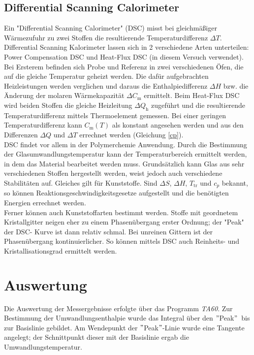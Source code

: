 \documentclass[12pt,a4paper,titlepage,headinclude,bibtotoc]{scrartcl}
\begin{document}
\subsection{Differential Scanning Calorimeter}
Ein "Differential Scanning Calorimeter" (DSC) misst bei gleichmäßiger Wärmezufuhr zu zwei Stoffen die resultierende Temperaturdifferenz $\Delta T$.
Differential Scanning Kalorimeter lassen sich in 2 verschiedene Arten unterteilen: Power Compensation DSC und Heat-Flux DSC (in diesem Versuch verwendet). Bei Ersterem befinden sich Probe und Referenz in zwei verschiedenen Öfen, die auf die gleiche Temperatur geheizt werden. Die dafür aufgebrachten Heizleistungen werden verglichen und daraus die Enthalpiedifferenz $\Delta H$ bzw. die Änderung der molaren Wärmekapazität $\Delta C_\mathrm{m}$ ermittelt.
Beim Heat-Flux DSC wird beiden Stoffen die gleiche Heizleitung $\Delta Q_\mathrm{h}$ zugeführt und die resultierende Temperaturdifferenz mittels Thermoelement gemessen.
Bei einer geringen Temperaturdifferenz kann $C_\mathrm{m}(T)$ als konstant angesehen werden und aus den Differenzen $\Delta Q$ und $\Delta T$ errechnet werden (Gleichung \ref{cp}).\\

DSC findet vor allem in der Polymerchemie Anwendung. Durch die Bestimmung der Glasumwandlungstemperatur kann der Temperaturbereich ermittelt werden, in dem das Material bearbeitet werden muss. Grundsätzlich kann Glas aus sehr verschiedenen Stoffen hergestellt werden, weist jedoch auch verschiedene Stabilitäten auf. Gleiches gilt für Kunststoffe. 
Sind $\Delta S$, $\Delta H$, $T_\mathrm{tr}$ und $c_p$ bekannt, so können Reaktionsgeschwindigkeitsgesetze aufgestellt und die benötigten Energien errechnet werden.\\ 
Ferner können auch Kunststoffarten bestimmt werden.
Stoffe mit geordnetem Kristallgitter neigen eher zu einem Phasenübergang erster Ordnung; der "Peak" der DSC- Kurve ist dann relativ schmal. Bei unreinen Gittern ist der Phasenübergang  kontinuierlicher. So können mittels DSC auch Reinheits- und Kristallisationsgrad ermittelt werden.\\



\section{Auswertung}
Die Auswertung der Messergebnisse erfolgte über das Programm \textit{TA60}. Zur Bestimmung der Umwandlungsenthalpie wurde das Integral über den $"$Peak$"$\, bis zur Basislinie gebildet. Am Wendepunkt der $"$Peak$"$-Linie wurde eine Tangente angelegt; der Schnittpunkt dieser mit der Basislinie ergab die Umwandlungstemperatur.\\ 
\end{document}
